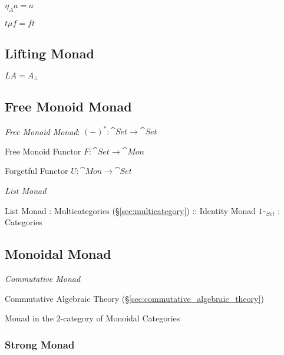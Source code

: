 $\eta_A a = a$

$t \mu f = f t$



\subsection{Lifting Monad}\label{sec:lifting_monad}

$L A = A_\bot$




\subsection{Free Monoid Monad}\label{sec:free_monoid_monad}

\emph{Free Monoid Monad}: $(-)^* : \cat{Set} \rightarrow \cat{Set}$

Free Monoid Functor $F : \cat{Set} \rightarrow \cat{Mon}$

Forgetful Functor $U : \cat{Mon} \rightarrow \cat{Set}$

\emph{List Monad}

List Monad : Multicategories (\S\ref{sec:multicategory}) :: Identity
Monad $1_{\cat{Set}}$ : Categories



\subsection{Monoidal Monad}\label{sec:monoidal_monad}

\emph{Commutative Monad}

Commutative Algebraic Theory
(\S\ref{sec:commutative_algebraic_theory})

Monad in the $2$-category of Monoidal Categories




\subsubsection{Strong Monad}\label{sec:strong_monad}

